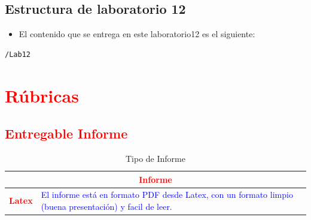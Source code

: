 \documentclass{article}
\begin{document}
	\subsection{Estructura de laboratorio 12}
	\begin{itemize}	
		\item El contenido que se entrega en este laboratorio12 es el siguiente:
	\end{itemize}
	\begin{lstlisting}[style=ascii-tree]
	/Lab12	

	\end{lstlisting}    
	\section{\textcolor{red}{Rúbricas}}
	
	\subsection{\textcolor{red}{Entregable Informe}}
	\begin{table}[H]
		\caption{Tipo de Informe}
		\setlength{\tabcolsep}{0.5em} %
		{\renewcommand{\arraystretch}{1.5}%
		\begin{tabular}{|p{3cm}|p{12cm}|}
			\hline
			\multicolumn{2}{|c|}{\textbf{\textcolor{red}{Informe}}}  \\
			\hline 
			\textbf{\textcolor{red}{Latex}} & \textcolor{blue}{El informe está en formato PDF desde Latex,  con un formato limpio (buena presentación) y facil de leer.}   \\ 
			\hline 
			
			
		\end{tabular}
	}
	\end{table}
	
	\clearpage
	
\end{document}
